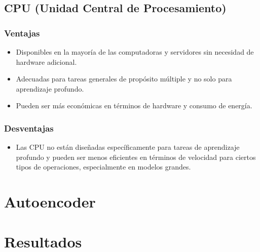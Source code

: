 \subsection{CPU (Unidad Central de Procesamiento)}

\subsubsection{Ventajas}
\begin{itemize}
    \item Disponibles en la mayoría de las computadoras y servidores sin necesidad de hardware adicional.
    \item Adecuadas para tareas generales de propósito múltiple y no solo para aprendizaje profundo.
    \item Pueden ser más económicas en términos de hardware y consumo de energía.
\end{itemize}

\subsubsection{Desventajas}
\begin{itemize}
    \item Las CPU no están diseñadas específicamente para tareas de aprendizaje profundo y pueden ser menos eficientes en términos de velocidad para ciertos tipos de operaciones, especialmente en modelos grandes.
\end{itemize}

\section{Autoencoder}
\section{Resultados}















